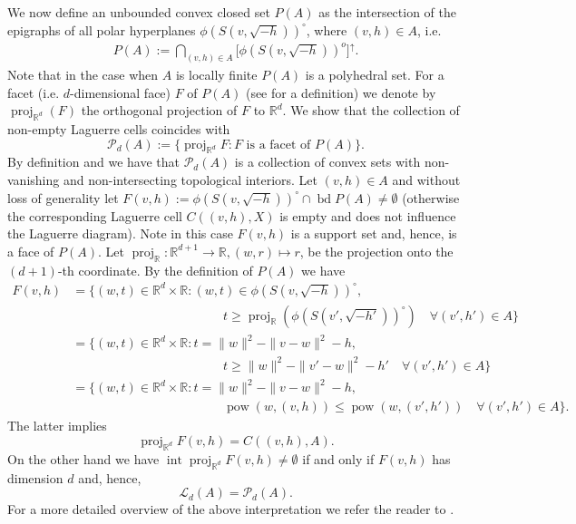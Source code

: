 \documentclass[11pt,a4paper]{article}
\theoremstyle{plain}
\theoremstyle{definition}
\theoremstyle{remark}
\def\RR{\mathbb{R}}
\def\cL{\mathcal{L}}
\def\cP{\mathcal{P}}
\newcommand{\pow}{\mathop{\mathrm{pow}}\nolimits}
\newcommand{\proj}{\operatorname{proj}}
\newcommand{\inter}{\operatorname{int}}
\newcommand{\bd}{\operatorname{bd}}
\begin{document}
We now define an unbounded convex closed set $P(A)$ as the intersection of the epigraphs of all polar hyperplanes 
$\phi(S(v,\sqrt{-h}))^{\circ}$, where $(v,h) \in A$, i.e.
\begin{align}\label{def:polyhedralset}
    P(A):=\bigcap_{(v,h)\in A}\big[\phi(S(v,\sqrt{-h}))^{o}\big]^{\uparrow}.
\end{align}
Note that in the case when $A$ is locally finite $P(A)$ is a polyhedral set. For a facet (i.e. $d$-dimensional face) $F$ of $P(A)$ (see \cite[Section 1.4 and Section 2.1]{Schneider} for a definition) we denote by $\proj_{\RR^d}(F)$ the orthogonal projection of $F$ to $\RR^d$. We show that the collection of non-empty Laguerre cells coincides with
\[
    \mathcal{P}_d(A):=\{\proj_{\RR^d}F:F\text{ is a facet of }P(A)\}.
\]
By definition and \cite[Theorem 2.1.2]{Schneider} we have that $\mathcal{P}_d(A)$ is a collection of convex sets with non-vanishing and non-intersecting topological interiors. Let $(v,h)\in A$ and without loss of generality let $F(v,h):=\phi(S(v,\sqrt{-h}))^\circ \cap \bd P(A) \neq \emptyset$ (otherwise the corresponding Laguerre cell $C((v,h),X)$ is empty and does not influence the Laguerre diagram). Note in this case $F(v,h)$ is a support set and, hence, is a face of $P(A)$.  Let $\proj_{\RR}:\RR^{d+1} \to \RR, (w,r)\mapsto r$, be the projection onto the $(d+1)$-th coordinate. By the definition of $P(A)$ we have 
\begin{align*}
    F(v,h)&=\{(w,t)\in \RR^d \times \RR: (w,t) \in \phi(S(v,\sqrt{-h}))^\circ, \\
    &\hspace{5cm} t \ge \proj_{\RR}(\phi(S(v',\sqrt{-h'}))^\circ) \quad \forall (v',h') \in A\}\\
    &=\{(w,t)\in \RR^d \times \RR: t=\|w\|^2-\|v-w\|^2-h,\\
    &\hspace{5cm} t \ge \|w\|^2-\|v'-w\|^2-h' \quad \forall (v',h') \in A\}\\
    &=\{(w,t)\in \RR^d \times \RR:  t=\|w\|^2-\|v-w\|^2-h,\\
    &\hspace{5cm}\pow(w,(v,h)) \le \pow(w,(v',h')) \quad \forall (v',h') \in A\}.
\end{align*}
The latter implies
\[
    \proj_{\RR^d} F(v,h) = C((v,h),A).
\]
On the other hand we have $\inter \proj_{\RR^d} F(v,h)\neq \emptyset$ if and only if $F(v,h)$ has dimension $d$ and, hence, 
\[
    \cL_d(A)=\cP_d(A).
\]
For a more detailed overview of the above interpretation we refer the reader to \cite[Chapters 17,18]{BY98}.
\end{document}
